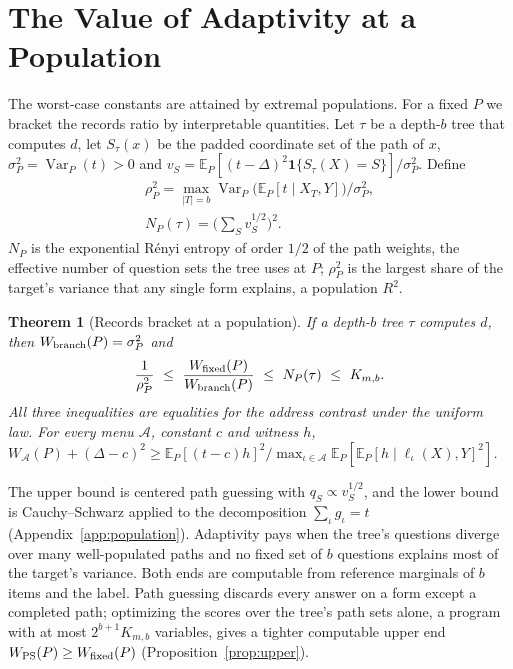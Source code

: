 \documentclass{article}
\newtheorem{theorem}{Theorem}
\newcommand{\E}{\mathbb{E}}
\newcommand{\Var}{\operatorname{Var}}
\newcommand{\A}{\mathcal A}
\begin{document}
\section{The Value of Adaptivity at a Population}\label{sec:population}
The worst-case constants are attained by extremal populations. For a fixed $P$ we bracket the records ratio by interpretable quantities. Let $\tau$ be a depth-$b$ tree that computes $d$, let $S_\tau(x)$ be the padded coordinate set of the path of $x$, $\sigma_P^2=\Var_P(t)>0$ and $v_S=\E_P[(t-\Delta)^2\mathbf 1\{S_\tau(X)=S\}]/\sigma_P^2$. Define
\begin{gather*}
 \rho_P^2=\max_{|T|=b}\Var_P\big(\E_P[t\mid X_T,Y]\big)\big/\sigma_P^2,\\
 N_P(\tau)=\Big(\sum\nolimits_Sv_S^{1/2}\Big)^2.
\end{gather*}
$N_P$ is the exponential R\'enyi entropy of order $1/2$ of the path weights, the effective number of question sets the tree uses at $P$; $\rho_P^2$ is the largest share of the target's variance that any single form explains, a population $R^2$.

\begin{theorem}[Records bracket at a population]\label{thm:bracket}
If a depth-$b$ tree $\tau$ computes $d$, then $W_{\rm branch}(P)=\sigma_P^2$ and
\[
 \frac1{\rho_P^2}\ \le\ \frac{W_{\rm fixed}(P)}{W_{\rm branch}(P)}\ \le\ N_P(\tau)\ \le\ K_{m,b}.
\]
All three inequalities are equalities for the address contrast under the uniform law. For every menu $\A$, constant $c$ and witness $h$, $W_\A(P)+(\Delta-c)^2\ge\E_P[(t-c)h]^2/\max_{\iota\in\A}\E_P[\E_P[h\mid\ell_\iota(X),Y]^2]$.
\end{theorem}
The upper bound is centered path guessing with $q_S\propto v_S^{1/2}$, and the lower bound is Cauchy--Schwarz applied to the decomposition $\sum_\iota g_\iota=t$ (Appendix~\ref{app:population}). Adaptivity pays when the tree's questions diverge over many well-populated paths and no fixed set of $b$ questions explains most of the target's variance. Both ends are computable from reference marginals of $b$ items and the label. Path guessing discards every answer on a form except a completed path; optimizing the scores over the tree's path sets alone, a program with at most $2^{b+1}K_{m,b}$ variables, gives a tighter computable upper end $W_{\rm PS}(P)\ge W_{\rm fixed}(P)$ (Proposition~\ref{prop:upper}).
\end{document}
